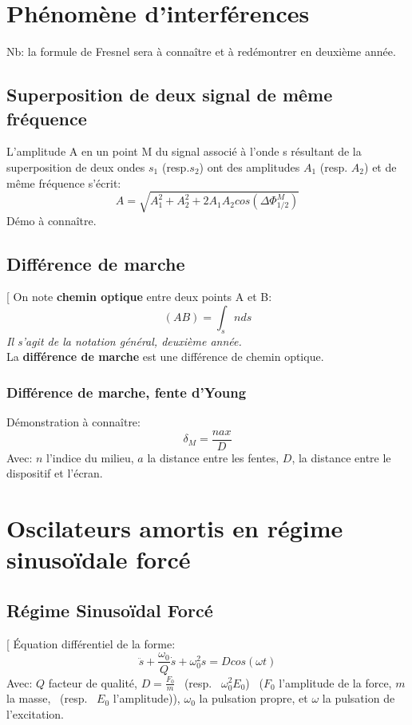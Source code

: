 \documentclass[12pt,hidelinks]{article}
\begin{document}
\section{Phénomène d'interférences}
\vspace{3cm}
    Nb: la formule de Fresnel sera à connaître et à redémontrer en deuxième année.
	\subsection{Superposition de deux signal de même fréquence}
        L'amplitude A en un point M du signal associé à l'onde s résultant de la superposition de deux ondes $s_1$ (resp.$s_2$) ont des amplitudes $A_1$ (resp. $A_2$) et de même fréquence s'écrit:
        \[A=\sqrt{A_1^2 + A_2^2 + 2A_1 A_2 cos(\Delta \Phi_{1/2}^M)}\]
        Démo à connaître.
    \subsection{Différence de marche}
        \begin{DashedDefinition}{}[
        On note \textbf{chemin optique} entre deux points A et B:
        \[(AB)=\int_s n ds\]
        \textit{Il s'agit de la notation général, deuxième année.} \\
        La \textbf{différence de marche} est une différence de chemin optique.
        \end{DashedDefinition}
    \subsubsection{Différence de marche, fente d'Young}
    Démonstration à connaître:
    \[\delta_M=\frac{nax}{D}\]
    Avec: $n$ l'indice du milieu, $a$ la distance entre les fentes, $D$, la distance entre le dispositif et l'écran.
\newpage
\section{Oscilateurs amortis en régime sinusoïdale forcé}
\vspace{3cm}
    \subsection{Régime Sinusoïdal Forcé}
    \begin{DashedDefinition}{}[
    Équation différentiel de la forme:
    \[\ddot{s}+\frac{\omega_0}{Q}\dot{s}+\omega_0^2 s = D cos(\omega t)\]
    Avec: $Q$ facteur de qualité, $D=\frac{F_0}{m}$ \ (resp. \ $\omega_0^2E_0$) \ ($F_0$ l'amplitude de la force, $m$ la masse, \ (resp. \ $E_0$ l'amplitude)), $\omega_0$ la pulsation propre, et $\omega$ la pulsation de l'excitation.
    \end{DashedDefinition}
\end{document}
